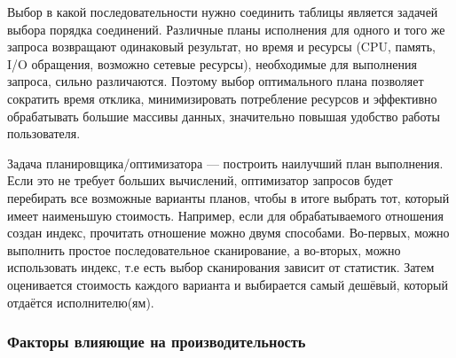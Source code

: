 \documentclass[12pt]{article}
\begin{document}
\begin{flushleft}
\begin{center}
    \end{center}

Выбор в какой последовательности нужно соединить таблицы является задачей выбора 
порядка соединений. Различные планы исполнения для одного и того же запроса возвращают 
одинаковый результат, но время и ресурсы (CPU, память, I/O обращения, возможно 
сетевые ресурсы), необходимые для выполнения запроса, сильно различаются. Поэтому 
выбор оптимального плана позволяет сократить время отклика, минимизировать 
потребление ресурсов и эффективно обрабатывать большие массивы данных, значительно 
повышая удобство работы пользователя.
\newline

    Задача планировщика/оптимизатора — построить наилучший план выполнения. 
Если это не требует больших вычислений, оптимизатор запросов будет перебирать 
все возможные варианты планов, чтобы в итоге выбрать тот, который имеет наименьшую 
стоимость. Например, если для обрабатываемого отношения создан индекс, прочитать 
отношение можно двумя способами. Во-первых, можно выполнить простое последовательное 
сканирование, а во-вторых, можно использовать индекс, т.е есть выбор сканирования зависит 
от статистик. Затем оценивается стоимость 
каждого варианта и выбирается самый дешёвый, который отдаётся исполнителю(ям).
\centering \subsubsection*{Факторы влияющие на производительность}
\raggedright


\end{flushleft}
\end{document}
